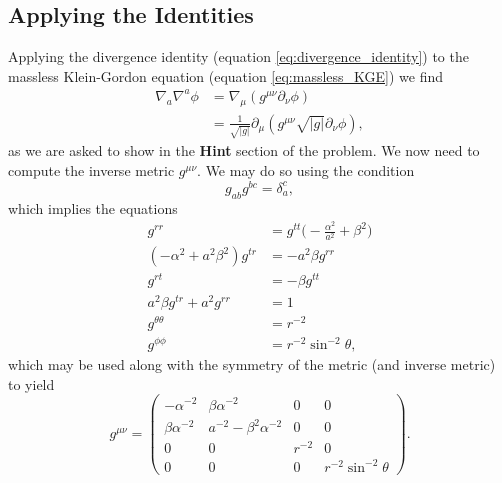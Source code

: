 \documentclass[12pt]{article}
\numberwithin{equation}{section}
\begin{document}
\subsection{Applying the Identities}
Applying the divergence identity (equation \ref{eq:divergence_identity}) to the massless Klein-Gordon equation (equation \ref{eq:massless_KGE}) we find
\begin{equation} \label{eq:KGE_hint_form}
\begin{aligned}
\nabla_a \nabla^a \phi &= \nabla_\mu (g^{\mu \nu}\partial_\nu \phi) \\
&= \frac{1}{\sqrt{|g|}} \partial_\mu (g^{\mu \nu} \sqrt{|g|} \partial_\nu \phi),
\end{aligned}
\end{equation}
as we are asked to show in the \textbf{Hint} section of the problem.  We now  need to compute the inverse metric $g^{\mu \nu}$.  We may do so using the condition
\begin{equation}
g_{a b} g^{b c} = \delta_a^c,
\end{equation}
which implies the equations
\begin{equation}
\begin{aligned}
g^{rr} &= g^{tt} \Big(-\frac{\alpha^2}{a^2} + \beta^2\Big) \\
(-\alpha^2 + a^2 \beta^2) g^{tr} &= -a^2 \beta g^{rr} \\
g^{rt} &= -\beta g^{tt} \\
a^2 \beta g^{tr} + a^2 g^{rr} &= 1 \\
g^{\theta \theta} &= r^{-2} \\
g^{\phi \phi} &= r^{-2} \sin^{-2} \theta,
\end{aligned}
\end{equation}
which may be used along with the symmetry of the metric (and inverse metric) to yield
\begin{equation} \label{eq:inverse_metric}
g^{\mu \nu} =
\begin{pmatrix}
-\alpha^{-2} & \beta \alpha^{-2} & 0 & 0 \\
\beta \alpha^{-2} & a^{-2} - \beta^{2} \alpha^{-2} & 0 & 0 \\
0 & 0 & r^{-2} & 0 \\
0 & 0 & 0 & r^{-2} \sin^{-2} \theta
\end{pmatrix}.
\end{equation}
\end{document}
